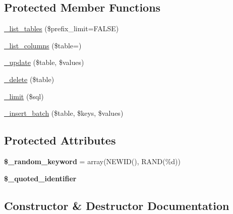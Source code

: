 \subsection*{Protected Member Functions}
\begin{DoxyCompactItemize}
\item 
\mbox{\hyperlink{class_c_i___d_b__pdo__dblib__driver_a69cbb9bb8ce520296a323f5314063a6b}{\+\_\+list\+\_\+tables}} (\$prefix\+\_\+limit=F\+A\+L\+SE)
\item 
\mbox{\hyperlink{class_c_i___d_b__pdo__dblib__driver_a4ddd8c3265777f8dfe9615d2f598938c}{\+\_\+list\+\_\+columns}} (\$table=\textquotesingle{}\textquotesingle{})
\item 
\mbox{\hyperlink{class_c_i___d_b__pdo__dblib__driver_a099b8d59b2fed151b0ec3de287ce7cea}{\+\_\+update}} (\$table, \$values)
\item 
\mbox{\hyperlink{class_c_i___d_b__pdo__dblib__driver_a546c9873a327d1b374ce0dea213d5f82}{\+\_\+delete}} (\$table)
\item 
\mbox{\hyperlink{class_c_i___d_b__pdo__dblib__driver_a1f216d9cc14f03c54290f5ea9ead1dd6}{\+\_\+limit}} (\$sql)
\item 
\mbox{\hyperlink{class_c_i___d_b__pdo__dblib__driver_a90c48d04f257bf9685399205984829a3}{\+\_\+insert\+\_\+batch}} (\$table, \$keys, \$values)
\end{DoxyCompactItemize}
\subsection*{Protected Attributes}
\begin{DoxyCompactItemize}
\item 
\mbox{\label{class_c_i___d_b__pdo__dblib__driver_adf9560c68627648d8c563f8d6953f53b}} 
{\bfseries \$\+\_\+random\+\_\+keyword} = array(\textquotesingle{}N\+E\+W\+ID()\textquotesingle{}, \textquotesingle{}R\+A\+ND(\%d)\textquotesingle{})
\item 
\mbox{\label{class_c_i___d_b__pdo__dblib__driver_aa9a19d808c9bf1b4c4968a263586b331}} 
{\bfseries \$\+\_\+quoted\+\_\+identifier}
\end{DoxyCompactItemize}


\subsection{Constructor \& Destructor Documentation}
\mbox{\label{class_c_i___d_b__pdo__dblib__driver_a76a5061755752b903b745fac17b8eb56}} 
